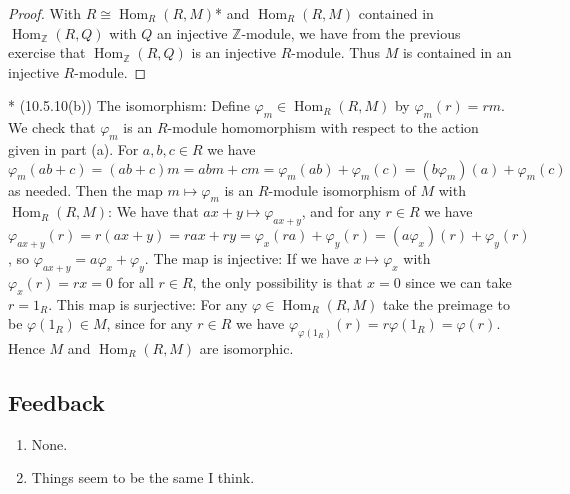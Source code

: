 \documentclass[11pt]{article}
\DeclareMathOperator{\Hom}{Hom}
\begin{document}
\begin{enumerate}
\begin{enumerate}
\begin{proof}
            With $R\cong \Hom_R(R,M)$* and $\Hom_R(R,M)$ contained in $\Hom_{\mathbb{Z}}(R,Q)$ with $Q$ an injective $\mathbb{Z}$-module, we have from the previous exercise that $\Hom_{\mathbb{Z}}(R,Q)$ is an injective $R$-module. Thus $M$ is contained in an injective $R$-module.
        \end{proof}
        * (10.5.10(b)) The isomorphism: Define $\varphi_m\in \Hom_R(R,M)$ by $\varphi_m(r) = rm$. We check that $\varphi_m$ is an $R$-module homomorphism with respect to the action given in part (a). For $a,b,c\in R$ we have $\varphi_m(ab+c) = (ab+c)m = abm+cm = \varphi_m(ab) + \varphi_m(c) = (b\varphi_m)(a) + \varphi_m(c)$ as needed. Then the map $m\mapsto \varphi_m$ is an $R$-module isomorphism of $M$ with $\Hom_R(R,M)$: We have that $ax+y\mapsto \varphi_{ax+y}$, and for any $r\in R$ we have $\varphi_{ax+y}(r) = r(ax+y) = rax+ry= \varphi_x(ra) + \varphi_y(r) = (a\varphi_x)(r) + \varphi_y(r)$, so $\varphi_{ax+y} = a\varphi_x + \varphi_y$. The map is injective: If we have $x\mapsto \varphi_x$ with $\varphi_x(r) = rx = 0$ for all $r\in R$, the only possibility is that $x = 0$ since we can take $r=1_R$. This map is surjective: For any $\varphi\in \Hom_R(R,M)$ take the preimage to be $\varphi(1_R)\in M$, since for any $r\in R$ we have $\varphi_{\varphi(1_R)}(r) = r\varphi(1_R) = \varphi(r)$. Hence $M$ and $\Hom_R(R,M)$ are isomorphic.
    \end{enumerate}
\end{enumerate}
\subsection*{Feedback}
\begin{enumerate}
    \item None.
    \item Things seem to be the same I think.
\end{enumerate}
\end{document}
